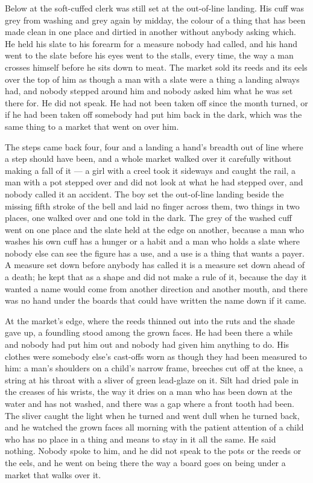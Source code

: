 \scenebreak

Below  at  the soft-cuffed clerk was still set at the out-of-line landing. His cuff was grey from washing and grey again by midday, the colour of a thing that has been made clean in one place and dirtied in another without anybody asking which. He held his slate to his forearm for a measure nobody had called, and his hand went to the slate before his eyes went to the stalls, every time, the way a man crosses himself before he sits down to meat. The market sold its reeds and its eels over the top of him as though a man with a slate were a thing a landing always had, and nobody stepped around him and nobody asked him what he was set there for. He did not speak. He had not been taken off since the month turned, or if he had been taken off somebody had put him back in the dark, which was the same thing to a market that went on over him.

The steps came back four, four and a landing a hand's breadth out of line where a step should have been, and a whole market walked over it carefully without making a fall of it --- a girl with a creel took it sideways and caught the rail, a man with a pot stepped over and did not look at what he had stepped over, and nobody called it an accident. The boy set the out-of-line landing beside the missing fifth stroke of the bell and laid no finger across them, two things in two places, one walked over and one told in the dark. The grey of the washed cuff went on one place and the slate held at the edge on another, because a man who washes his own cuff has a hunger or a habit and a man who holds a slate where nobody else can see the figure has a use, and a use is a thing that wants a payer. A measure set down before anybody has called it is a measure set down ahead of a death; he kept that as a shape and did not make a rule of it, because the day it wanted a name would come from another direction and another mouth, and there was no hand under the boards that could have written the name down if it came.

\scenebreak

At the market's edge, where the reeds thinned out into the ruts and the shade gave up, a foundling stood among the grown faces. He had been there a while and nobody had put him out and nobody had given him anything to do. His clothes were somebody else's cast-offs worn as though they had been measured to him: a man's shoulders on a child's narrow frame, breeches cut off at the knee, a string at his throat with a sliver of green lead-glaze on it. Silt had dried pale in the creases of his wrists, the way it dries on a man who has been down at the water and has not washed, and there was a gap where a front tooth had been. The sliver caught the light when he turned and went dull when he turned back, and he watched the grown faces all morning with the patient attention of a child who has no place in a thing and means to stay in it all the same. He said nothing. Nobody spoke to him, and he did not speak to the pots or the reeds or the eels, and he went on being there the way a board goes on being under a market that walks over it.

